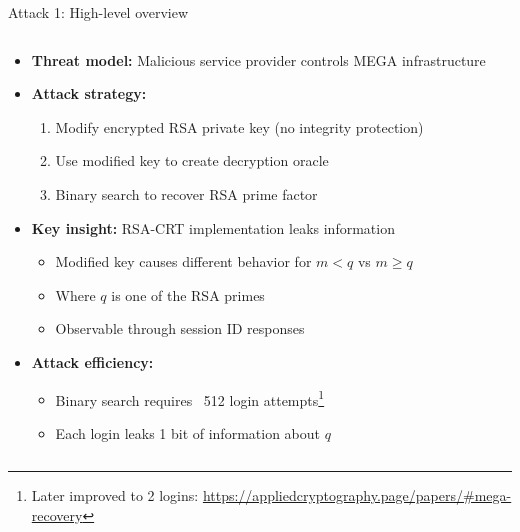 \documentclass[aspectratio=169, lualatex, handout]{beamer}
\begin{document}
\begin{frame}{Attack 1: High-level overview}
	\begin{columns}[c]
		\begin{column}{1\textwidth}
			\begin{itemize}
				\item \textbf{Threat model:} Malicious service provider controls MEGA infrastructure
				\item \textbf{Attack strategy:}
				      \begin{enumerate}
					      \item Modify encrypted RSA private key (no integrity protection)
					      \item Use modified key to create decryption oracle
					      \item Binary search to recover RSA prime factor
				      \end{enumerate}
				\item \textbf{Key insight:} RSA-CRT implementation leaks information
				      \begin{itemize}
					      \item Modified key causes different behavior for $m < q$ vs $m \geq q$
					      \item Where $q$ is one of the RSA primes
					      \item Observable through session ID responses
				      \end{itemize}
				\item \textbf{Attack efficiency:}
				      \begin{itemize}
					      \item Binary search requires ~512 login attempts\footnote{Later improved to 2 logins: \url{https://appliedcryptography.page/papers/\#mega-recovery}}
					      \item Each login leaks 1 bit of information about $q$
				      \end{itemize}
			\end{itemize}
		\end{column}
	\end{columns}
\end{frame}
\end{document}
